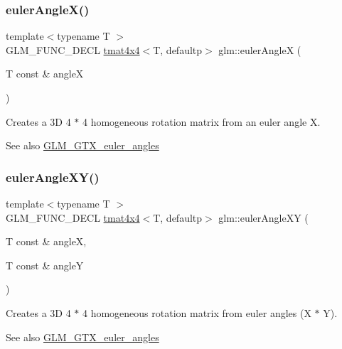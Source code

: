 \subsubsection{\texorpdfstring{euler\+Angle\+X()}{eulerAngleX()}}
{\footnotesize\ttfamily template$<$typename T $>$ \\
G\+L\+M\+\_\+\+F\+U\+N\+C\+\_\+\+D\+E\+CL \hyperlink{structglm_1_1tmat4x4}{tmat4x4}$<$T, defaultp$>$ glm\+::euler\+AngleX (\begin{DoxyParamCaption}\item[{T const \&}]{angleX }\end{DoxyParamCaption})}

Creates a 3D 4 $\ast$ 4 homogeneous rotation matrix from an euler angle X. \begin{DoxySeeAlso}{See also}
\hyperlink{group__gtx__euler__angles}{G\+L\+M\+\_\+\+G\+T\+X\+\_\+euler\+\_\+angles} 
\end{DoxySeeAlso}
\mbox{\label{group__gtx__euler__angles_ga8bf84f92ca976a7f50dbe4b30ceb72dd}} 
\subsubsection{\texorpdfstring{euler\+Angle\+X\+Y()}{eulerAngleXY()}}
{\footnotesize\ttfamily template$<$typename T $>$ \\
G\+L\+M\+\_\+\+F\+U\+N\+C\+\_\+\+D\+E\+CL \hyperlink{structglm_1_1tmat4x4}{tmat4x4}$<$T, defaultp$>$ glm\+::euler\+Angle\+XY (\begin{DoxyParamCaption}\item[{T const \&}]{angleX,  }\item[{T const \&}]{angleY }\end{DoxyParamCaption})}

Creates a 3D 4 $\ast$ 4 homogeneous rotation matrix from euler angles (X $\ast$ Y). \begin{DoxySeeAlso}{See also}
\hyperlink{group__gtx__euler__angles}{G\+L\+M\+\_\+\+G\+T\+X\+\_\+euler\+\_\+angles} 
\end{DoxySeeAlso}
\mbox{\label{group__gtx__euler__angles_gaaedda1657a1aebe0a904d864b33844e8}} 
